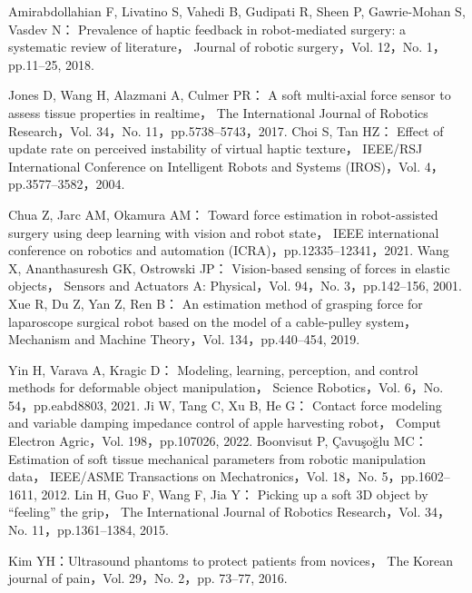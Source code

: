\documentclass[a4paper]{jarticle}
\begin{document}
\begin{thebibliography}{9}
    Amirabdollahian F, Livatino S, Vahedi B, Gudipati R, Sheen P, Gawrie-Mohan S, Vasdev N：
    Prevalence of haptic feedback in robot-mediated surgery: a systematic review of literature，
    Journal of robotic surgery，Vol. 12，No. 1，pp.11–25, 2018.





    Jones D, Wang H, Alazmani A, Culmer PR：
    A soft multi-axial force sensor to assess tissue properties in realtime，
    The International Journal of Robotics Research，Vol. 34，No. 11，pp.5738–5743，2017.
    Choi S, Tan HZ：
    Effect of update rate on perceived instability of virtual haptic texture，
    IEEE/RSJ International Conference on Intelligent Robots and Systems (IROS)，Vol. 4，pp.3577–3582，2004.

    Chua Z, Jarc AM, Okamura AM：
    Toward force estimation in robot-assisted surgery using deep learning with vision and robot state，
    IEEE international conference on robotics and automation (ICRA)，pp.12335–12341，2021.
    Wang X, Ananthasuresh GK, Ostrowski JP：
    Vision-based sensing of forces in elastic objects，
    Sensors and Actuators A: Physical，Vol. 94，No. 3，pp.142–156, 2001.
    Xue R, Du Z, Yan Z, Ren B：
    An estimation method of grasping force for laparoscope surgical robot based on the model of a cable-pulley system，
    Mechanism and Machine Theory，Vol. 134，pp.440–454, 2019.


    Yin H, Varava A, Kragic D：
    Modeling, learning, perception, and control methods for deformable object manipulation，
    Science Robotics，Vol. 6，No. 54，pp.eabd8803, 2021.
    Ji W, Tang C, Xu B, He G：
    Contact force modeling and variable damping impedance control of apple harvesting robot，
    Comput Electron Agric，Vol. 198，pp.107026, 2022.
    Boonvisut P, Çavuşoğlu MC：
    Estimation of soft tissue mechanical parameters from robotic manipulation data，
    IEEE/ASME Transactions on Mechatronics，Vol. 18，No. 5，pp.1602–1611, 2012.
    Lin H, Guo F, Wang F, Jia Y：
    Picking up a soft 3D object by “feeling” the grip，
    The International Journal of Robotics Research，Vol. 34，No. 11，pp.1361–1384, 2015.

    Kim YH：Ultrasound phantoms to protect patients from novices，
    The Korean journal of pain，Vol. 29，No. 2，pp. 73–77, 2016.


\end{thebibliography}
\end{document}
